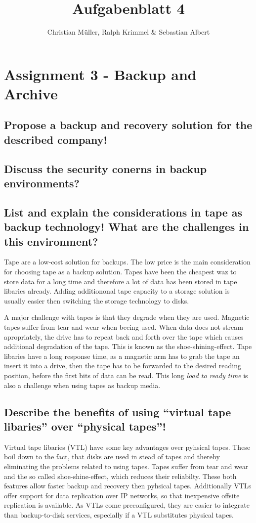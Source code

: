 \documentclass{article}
\title{Aufgabenblatt 4}
\author{Christian Müller, Ralph Krimmel \& Sebastian Albert }
\begin{document}
\maketitle

\section*{Assignment 3 - Backup and Archive}

\subsection{Propose a backup and recovery solution for the described company!}

\subsection{Discuss the security conerns in backup environments?}

\subsection{List and explain the considerations in tape as backup technology!
				What are the challenges in this environment?}
	Tape are a low-cost solution for backups.
	The low price is the main consideration for choosing tape as a backup solution.
	Tapes have been the cheapest waz to store data for a long time
	and therefore a lot of data has been stored in tape libaries already.
	Adding additiononal tape capacity to a storage solution is usually easier 
	then switching the storage technology to disks.
	
	A major challenge with tapes is that they degrade when they are used.
	Magnetic tapes suffer from tear and wear when beeing used.
	When data does not stream apropriately,
	the drive has to repeat back and forth over the tape
	which causes additional degradation of the tape.
	This is known as the shoe-shining-effect.
	Tape libaries have a long response time,
	as a magnetic arm has to grab the tape an insert it into a drive,
	then the tape has to be forwarded to the desired reading position,
	before the first bits of data can be read.
	This long \textsl{load to ready time} is also a challenge when using tapes as backup media.

\subsection{Describe the benefits of using ``virtual tape libaries'' over ``physical tapes''!}
	Virtual tape libaries (VTL) have some key advantages over pyhsical tapes.
	These boil down to the fact,
	that disks are used in stead of tapes
	and thereby eliminating the problems related to using tapes.
	Tapes suffer from tear and wear and the so called shoe-shine-effect,
	which reduces their reliabilty.
	These both features allow faster backup and recovery
	then pyhsical tapes.
	Additionally VTLs offer support for data replication over IP networks,
	so that inexpensive offsite replication is available.
	As VTLs come preconfigured,
	they are easier to integrate than backup-to-disk services,
	especially if a VTL substitutes physical tapes.
\end{document}
